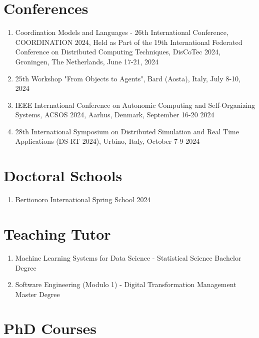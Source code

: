 \documentclass[runningheads]{llncs}
\begin{document}
\section{Conferences}
\begin{enumerate}
    \item Coordination Models and Languages - 26th International Conference, COORDINATION 2024, Held as Part of the 19th International Federated Conference on Distributed Computing Techniques, DisCoTec 2024, Groningen, The Netherlands, June 17-21, 2024
    \item 25th Workshop "From Objects to Agents", Bard (Aosta), Italy, July 8-10, 2024
    \item IEEE International Conference on Autonomic Computing and Self-Organizing Systems, ACSOS 2024, Aarhus, Denmark, September 16-20 2024
    \item 28th International Symposium on Distributed Simulation and Real Time Applications (DS-RT 2024), Urbino, Italy, October 7-9 2024
\end{enumerate}

\section{Doctoral Schools}
\begin{enumerate}
    \item Bertionoro International Spring School 2024
\end{enumerate}

\section{Teaching Tutor}
\begin{enumerate}
    \item Machine Learning Systems for Data Science - Statistical Science Bachelor Degree
    \item Software Engineering (Modulo 1) - Digital Transformation Management Master Degree
\end{enumerate}

\section{PhD Courses}
\end{document}
